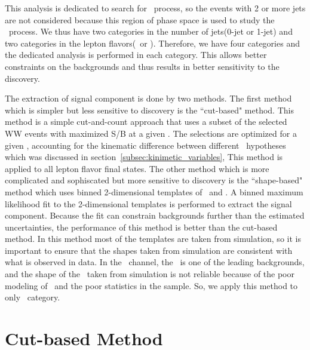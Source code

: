 This analysis is dedicated to search for \ggH\ process, 
so the events with 2 or more jets are not considered 
because this region of phase space is used to study the \qqH\ process. 
We thus have two categories in the number of jets(0-jet or 1-jet) 
and two categories in the lepton flavors(\DF\ or \SF). 
Therefore, we have four categories and the dedicated analysis 
is performed in each category. This allows better constraints on the 
backgrounds and thus results in better sensitivity to the discovery.  


The extraction of signal component is done by two methods. 
The first method which is simpler but less sensitive to discovery 
is the ``cut-based" method. This method is a simple cut-and-count approach 
that uses a subset of the selected WW events with maximized S/B at a given \mHi.
The selections are optimized for a given \mHi,
accounting for the kinematic difference between different \mHi\ hypotheses 
which was discussed in section~\ref{subsec:kinimetic_variables}, 
This method is applied to all lepton flavor final states. 
The other method which is more complicated and sophiscated but more sensitive to discovery 
is the ``shape-based" method which uses binned 2-dimensional templates of \mT\ and \mll. 
A binned maximum likelihood fit to the 2-dimensional templates is performed to extract 
the signal component. Because the fit can constrain backgrounds further than the estimated 
uncertainties, the performance of this method is better than the cut-based method. 
In this method most of the templates are taken from simulation,
so it is important to ensure that the shapes taken from simulation 
are consistent with what is observed in data. 
In the \SF\ channel, the \dyll\ is one of the leading backgrounds, and
the shape of the \dyll\ taken from simulation is not reliable because of the
poor modeling of \met\ and the poor statistics in the sample. So, we apply 
this method to only \DF\ category. 


\section{Cut-based Method}


